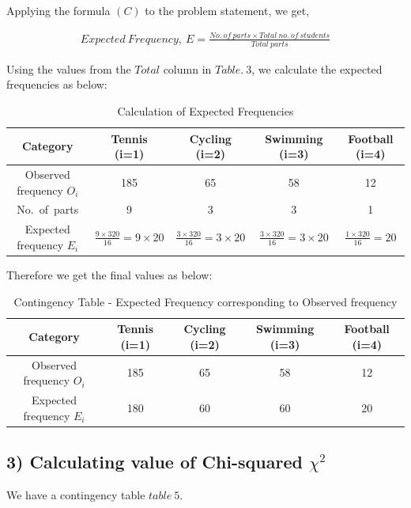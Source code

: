 \documentclass[a4paper]{report}
\begin{document}
Applying the formula $(C)$ to the problem statement, we get,

\begin{align}
    Expected\ Frequency,\ E= \frac{No.\ of\ parts \times Total\ no.\ of\ students}{Total\ parts}
\end{align}

Using the values from the $Total$ column in $Table.\ 3$, we calculate the expected frequencies as below:

\begin{table}[h]
    \centering
    \begin{tabular}{|c|c|c|c|c|}
        \hline
         Category & Tennis (i=1) & Cycling (i=2) & Swimming (i=3) & Football (i=4) \\ \hline
        Observed frequency $O_i$   & 185 & 65 & 58 & 12   \\ \hline
        No.\ of\ parts    & 9 & 3 & 3 & 1   \\ \hline
        Expected frequency $E_i$   & $\frac{9\times 320}{16}=9\times 20$ & $\frac{3\times 320}{16}=3\times 20$ & $\frac{3\times 320}{16}=3\times 20$ & $\frac{1\times 320}{16}=20$   \\ \hline
    \end{tabular}
    \caption{Calculation of Expected Frequencies}
    \label{tab:sample_table_3x5}
\end{table}

Therefore we get the final values as below:

\begin{table}[h]
    \centering
    \begin{tabular}{|c|c|c|c|c|}
        \hline
         Category & Tennis (i=1) & Cycling (i=2) & Swimming (i=3) & Football (i=4) \\ \hline
        Observed frequency $O_i$   & 185 & 65 & 58 & 12   \\ \hline
        Expected frequency $E_i$   & 180 & 60 & 60 & 20 \\ \hline
    \end{tabular}
    \caption{Contingency Table - Expected Frequency corresponding to Observed frequency}
    \label{tab:sample_table_3x5}
\end{table}

\subsection*{3) Calculating value of Chi-squared $\chi^2$}

We have a contingency table $table\ 5.$
\end{document}
